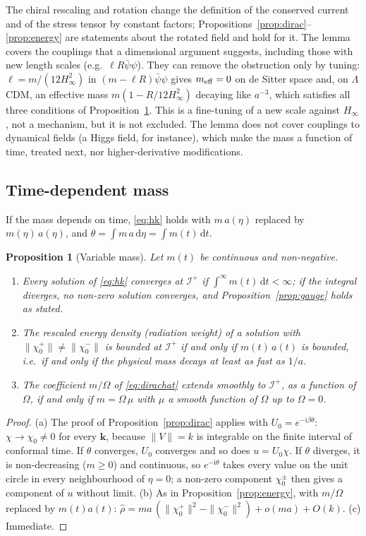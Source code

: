 \documentclass[11pt,a4paper]{article}
\newtheorem{proposition}{Proposition}
\theoremstyle{definition}
\newcommand{\scri}{\mathscr{I}^{+}}
\newcommand{\dd}{\mathrm{d}}
\newcommand{\ii}{\mathrm{i}}
\begin{document}
The chiral rescaling and rotation change the definition of the conserved current and of the stress tensor by constant factors; Propositions~\ref{prop:dirac}--\ref{prop:energy} are statements about the rotated field and hold for it. The lemma covers the couplings that a dimensional argument suggests, including those with new length scales (e.g.\ $\ell R\bar\psi\psi$). They can remove the obstruction only by tuning: $\ell=m/(12H_{\infty}^{2})$ in $(m-\ell R)\bar\psi\psi$ gives $m_{\rm eff}=0$ on de Sitter space and, on $\Lambda$CDM, an effective mass $m(1-R/12H_{\infty}^{2})$ decaying like $a^{-3}$, which satisfies all three conditions of Proposition~\ref{prop:varmass}. This is a fine-tuning of a new scale against $H_{\infty}$, not a mechanism, but it is not excluded. The lemma does not cover couplings to dynamical fields (a Higgs field, for instance), which make the mass a function of time, treated next, nor higher-derivative modifications.

\subsection{Time-dependent mass}
\label{sec:varmass}

If the mass depends on time, \eqref{eq:hk} holds with $m\,a(\eta)$ replaced by $m(\eta)\,a(\eta)$, and $\theta=\int m\,a\,\dd\eta=\int m(t)\,\dd t$.

\begin{proposition}[Variable mass]
\label{prop:varmass}
Let $m(t)$ be continuous and non-negative.
\begin{enumerate}[label=(\alph*)]
\item Every solution of \eqref{eq:hk} converges at $\scri$ if $\int^{\infty}m(t)\,\dd t<\infty$; if the integral diverges, no non-zero solution converges, and Proposition~\ref{prop:gauge} holds as stated.
\item The rescaled energy density (radiation weight) of a solution with $\|\chi_{0}^{+}\|\neq\|\chi_{0}^{-}\|$ is bounded at $\scri$ if and only if $m(t)\,a(t)$ is bounded, i.e.\ if and only if the physical mass decays at least as fast as $1/a$.
\item The coefficient $m/\Omega$ of \eqref{eq:dirachat} extends smoothly to $\scri$, as a function of $\Omega$, if and only if $m=\Omega\,\mu$ with $\mu$ a smooth function of $\Omega$ up to $\Omega=0$.
\end{enumerate}
\end{proposition}
\begin{proof}
(a) The proof of Proposition~\ref{prop:dirac} applies with $U_{0}=e^{-\ii\beta\theta}$: $\chi\to\chi_{0}\neq0$ for every $\mathbf{k}$, because $\|V\|=k$ is integrable on the finite interval of conformal time. If $\theta$ converges, $U_{0}$ converges and so does $u=U_{0}\chi$. If $\theta$ diverges, it is non-decreasing ($m\geq0$) and continuous, so $e^{-\ii\theta}$ takes every value on the unit circle in every neighbourhood of $\eta=0$; a non-zero component $\chi_{0}^{\pm}$ then gives a component of $u$ without limit. (b) As in Proposition~\ref{prop:energy}, with $m/\Omega$ replaced by $m(t)a(t)$: $\hat\rho=m a\,(\|\chi_{0}^{+}\|^{2}-\|\chi_{0}^{-}\|^{2})+o(m a)+O(k)$. (c) Immediate.
\end{proof}
\end{document}
